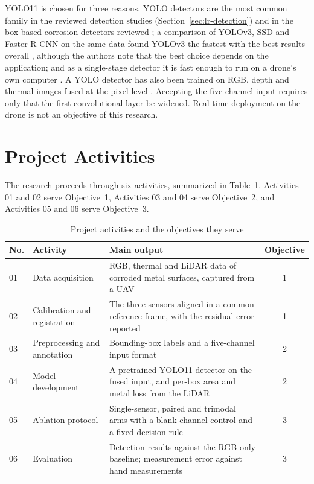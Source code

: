 YOLO11 is chosen for three reasons. YOLO detectors are the most common family in
the reviewed detection studies (Section~\ref{sec:lr-detection}) and in the
box-based corrosion detectors reviewed \citep{Mao2026,Fu2024,Bui2026,Li2024b,Yu2023};
a comparison of YOLOv3, SSD and Faster R-CNN on the same data found YOLOv3 the
fastest with the best results overall \citep{Srivastava2021}, although the
authors note that the best choice depends on the application; and as a
single-stage detector it is fast enough to run on a drone's own computer
\citep{Yu2023}. A YOLO detector has also been trained on RGB, depth and thermal images
fused at the pixel level \citep{Cao2026}. Accepting the five-channel input
requires only that the first convolutional layer be widened. Real-time
deployment on the drone is not an objective of this research.

\section{Project Activities}
\label{sec:project-activities}

The research proceeds through six activities, summarized in
Table~\ref{tab:activities}. Activities 01 and 02 serve Objective~1, Activities 03
and 04 serve Objective~2, and Activities 05 and 06 serve Objective~3.

\begin{table}[htbp]
\centering
\caption{Project activities and the objectives they serve}
\label{tab:activities}
\small
\renewcommand{\arraystretch}{1.2}
\begin{tabularx}{\textwidth}{@{}l>{\RaggedRight\arraybackslash}p{3.6cm}>{\RaggedRight\arraybackslash}Xc@{}}
\toprule
\textbf{No.} & \textbf{Activity} & \textbf{Main output} & \textbf{Objective} \\
\midrule
01 & Data acquisition & RGB, thermal and LiDAR data of corroded metal surfaces, captured from a UAV & 1 \\
02 & Calibration and registration & The three sensors aligned in a common reference frame, with the residual error reported & 1 \\
03 & Preprocessing and annotation & Bounding-box labels and a five-channel input format & 2 \\
04 & Model development & A pretrained YOLO11 detector on the fused input, and per-box area and metal loss from the LiDAR & 2 \\
05 & Ablation protocol & Single-sensor, paired and trimodal arms with a blank-channel control and a fixed decision rule & 3 \\
06 & Evaluation & Detection results against the RGB-only baseline; measurement error against hand measurements & 3 \\
\bottomrule
\end{tabularx}
\end{table}

